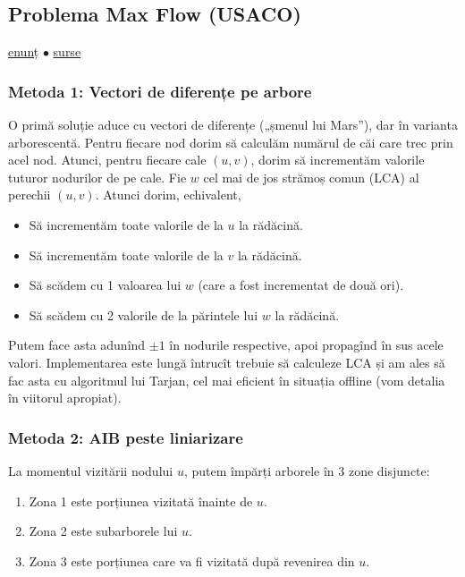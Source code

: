 \documentclass[../main.tex]{subfiles}
\begin{document}
\subsection{Problema Max Flow (USACO)}
\label{problem:max-flow}

\href{https://usaco.org/index.php?page=viewproblem2\&cpid=576}{enunț}
$\bullet$
\hyperref[code:max-flow]{surse}

\subsubsection*{Metoda 1: Vectori de diferențe pe arbore}

O primă soluție aduce cu vectori de diferențe („șmenul lui Mars”), dar în varianta arborescentă. Pentru fiecare nod dorim să calculăm numărul de căi care trec prin acel nod. Atunci, pentru fiecare cale $(u, v)$, dorim să incrementăm valorile tuturor nodurilor de pe cale. Fie $w$ cel mai de jos strămoș comun (LCA) al perechii $(u, v)$. Atunci dorim, echivalent,

\begin{itemize}
  \item Să incrementăm toate valorile de la $u$ la rădăcină.
  \item Să incrementăm toate valorile de la $v$ la rădăcină.
  \item Să scădem cu 1 valoarea lui $w$ (care a fost incrementat de două ori).
  \item Să scădem cu 2 valorile de la părintele lui $w$ la rădăcină.
\end{itemize}

Putem face asta adunînd $\pm 1$ în nodurile respective, apoi propagînd în sus acele valori. Implementarea este lungă întrucît trebuie să calculeze LCA și am ales să fac asta cu algoritmul lui Tarjan, cel mai eficient în situația offline (vom detalia în viitorul apropiat).

\subsubsection*{Metoda 2: AIB peste liniarizare}

La momentul vizitării nodului $u$, putem împărți arborele în 3 zone disjuncte:

\begin{enumerate}
  \item Zona 1 este porțiunea vizitată înainte de $u$.
  \item Zona 2 este subarborele lui $u$.
  \item Zona 3 este porțiunea care va fi vizitată după revenirea din $u$.
\end{enumerate}
\end{document}
